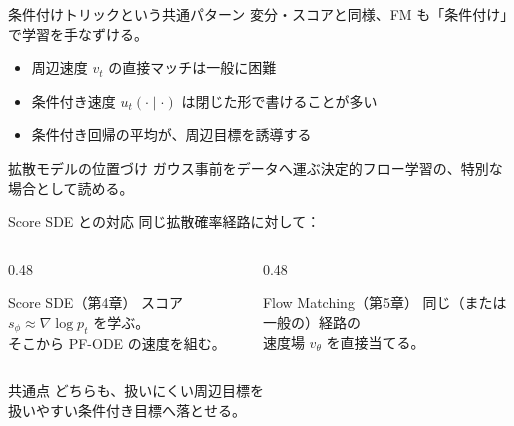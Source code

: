 \asmain
\begin{frame}{条件付けトリックという共通パターン}
    変分・スコアと同様、FM も「条件付け」で学習を手なずける。
    \begin{itemize}
        \item 周辺速度 $v_t$ の直接マッチは一般に困難
        \item 条件付き速度 $u_t(\cdot\mid \cdot)$ は閉じた形で書けることが多い
        \item 条件付き回帰の平均が、周辺目標を誘導する
    \end{itemize}
    \begin{exampleblock}{拡散モデルの位置づけ}
        ガウス事前をデータへ運ぶ決定的フロー学習の、特別な場合として読める。
    \end{exampleblock}
\end{frame}
\asmain
\begin{frame}{Score SDE との対応}
    同じ拡散確率経路に対して：
    \begin{columns}[T,onlytextwidth]
        \begin{column}{0.48\textwidth}
            \begin{block}{Score SDE（第4章）}
                スコア $s_\phi\approx\nabla\log p_t$ を学ぶ。\\
                そこから PF-ODE の速度を組む。
            \end{block}
        \end{column}
        \begin{column}{0.48\textwidth}
            \begin{block}{Flow Matching（第5章）}
                同じ（または一般の）経路の\\
                速度場 $v_\theta$ を直接当てる。
            \end{block}
        \end{column}
    \end{columns}
    \vfill
    \begin{block}{共通点}
        どちらも、扱いにくい周辺目標を\\
        扱いやすい条件付き目標へ落とせる。
    \end{block}
\end{frame}
\asmain
